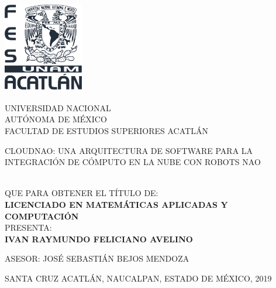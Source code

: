 \thispagestyle{empty}
\begin{center}
    \includegraphics[width=3.5cm, height=4cm]{escudofes}
\end{center}
\begin{center}
    {\scshape \Large UNIVERSIDAD NACIONAL}\\
    {\scshape \Large AUTÓNOMA DE MÉXICO}\\
    \vspace{.3cm}
    \vspace{.2cm}
    \vspace{.3cm}
    {\scshape \Large FACULTAD DE ESTUDIOS SUPERIORES ACATLÁN}
\end{center}
\begin{center}
  	\vspace{1.0cm}
    {CLOUDNAO: UNA ARQUITECTURA DE SOFTWARE PARA LA INTEGRACIÓN DE
CÓMPUTO EN LA NUBE CON ROBOTS NAO}
    \vspace{1.5cm}

    \\[5pt]
    \vspace{.3cm}
    QUE PARA OBTENER EL TÍTULO DE: \\[5pt]
    {\large \textbf{{LICENCIADO EN MATEMÁTICAS APLICADAS Y COMPUTACIÓN}}}\\[40pt]            
    PRESENTA:\\[5pt]
    \vspace{.2cm}
    {\large \textbf{{IVAN RAYMUNDO FELICIANO AVELINO}}}
    \vspace{1cm}

    { ASESOR: }
    \vspace{.2cm}
    {{JOSÉ SEBASTIÁN BEJOS MENDOZA}}
    \vspace{.5cm}

    {{SANTA CRUZ ACATLÁN, NAUCALPAN, ESTADO DE MÉXICO,}{ }{2019}}
\end{center}